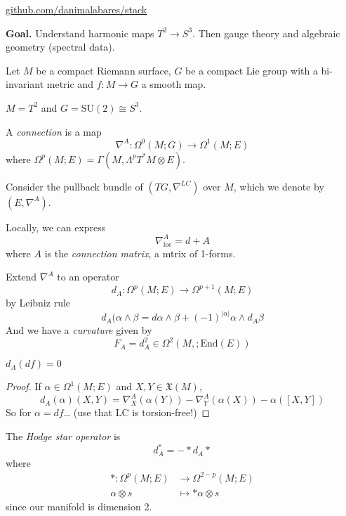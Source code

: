 



\title{}
\maketitle

\label{section-phantom}
\hfill
\href{http://github.com/danimalabares/stack}{github.com/danimalabares/stack}

\tableofcontents

{\bf Goal.} Understand harmonic maps $T^2 \to S^3$. Then gauge theory and
algebraic geometry (spectral data).

Let $M$ be a compact Riemann surface, $G$ be a compact Lie group with a
bi-invariant metric and $f:M\to G$ a smooth map.

\begin{example}
\label{example-torus}
$M=T^2$ and $G=\text{SU}(2)\cong S^3$.
\end{example}

\begin{definition}
\label{definition-connection}
A {\it connection} is a map
$$
\nabla^A:\Omega^{0}(M;G)\to \Omega^{1}(M;E)
$$
where $\Omega^{p}(M;E)=\Gamma(M,\Lambda^{p}T^*M\otimes E)$.
\end{definition}

Consider the pullback bundle of $(TG,\nabla^{LC})$ over $M$, which we denote by
$(E,\nabla^A)$.

Locally, we can express
$$
\nabla^A_{\text{loc}}=d+A
$$
where $A$ is the {\it connection matrix}, a mtrix of 1-forms.

Extend  $\nabla^A$ to an operator
$$
d_A:\Omega^{p}(M;E)\to \Omega^{p+1}(M;E)
$$
by Leibniz rule
$$
d_A(\alpha\wedge\beta=d\alpha\wedge\beta+(-1)^{|\alpha|}\alpha\wedge d_A\beta
$$
And we have a {\it curvature} given by
$$
F_A=d^2_A\in\Omega^{2}(M,;\text{End}(E))
$$

\begin{lemma}
\label{lemma-derivative-of-differential}
$d_A(df)=0$
\end{lemma}

\begin{proof}
If $\alpha\in\Omega^{1}(M;E)$ and $X,Y\in\mathfrak{X}(M)$,
$$
d_A(\alpha)(X,Y)=\nabla_X^A(\alpha(Y))-\nabla_Y^A(\alpha(X))-\alpha([X,Y])
$$
So for $\alpha=df$… (use that LC is torsion-free!)
\end{proof}

\begin{definition}
\label{definition-Hodge-star}
The {\it Hodge star operator} is
$$
d^*_A=-*d_A*
$$
where
\begin{align*}
*: \Omega^{p}(M;E) &\longrightarrow \Omega^{2-p}(M;E) \\
\alpha\otimes s &\longmapsto *\alpha\otimes s
\end{align*}
since our manifold is dimension 2.
\end{definition}

